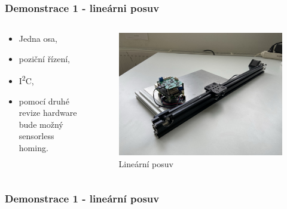 \documentclass[%
  12pt,       				%
	t,                  %
	aspectratio=1610,   %
	unicode,						%
]{beamer}				    	%
\begin{document}
\begin{frame}
	\frametitle{Demonstrace 1 - lineárni posuv}
	\begin{columns}[T] 								%
		\begin{column}{0.4\textwidth}
			\begin{itemize}
				\item Jedna osa,
				\item poziční řízení,
				\item I\textsuperscript{2}C,
				\item pomocí druhé revize hardware bude možný sensorless homing.
			\end{itemize}
		\end{column}
		\begin{column}{0.6\textwidth}		%
			\begin{figure}%
				\centering
				\includegraphics[width=0.8\columnwidth]{../Thesis/obrazky/rail}
				\caption{Lineární posuv}%
				\label{fig:sm4_block}
			\end{figure}
		\end{column}
	\end{columns}
\end{frame}

\begin{frame}
	\frametitle{Demonstrace 1 - lineární posuv}
\end{frame}
\end{document}
